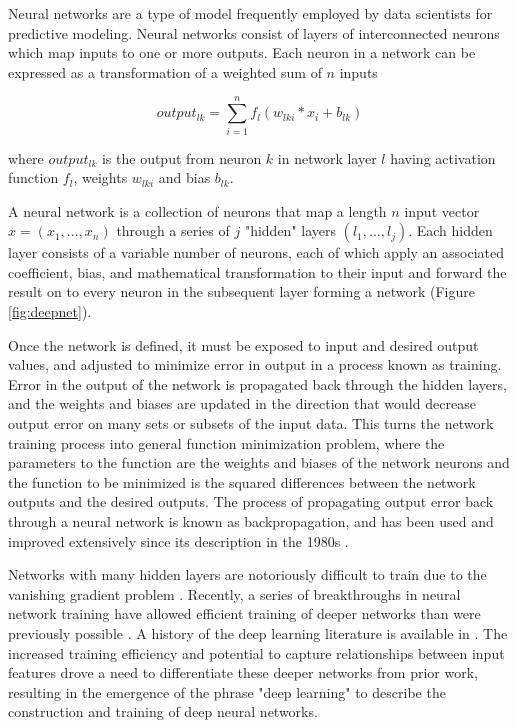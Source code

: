 Neural networks are a type of model frequently employed by data scientists
for predictive modeling. Neural networks consist of layers of interconnected neurons
which map inputs to one or more outputs. Each neuron in a network can be expressed as a 
transformation of a weighted sum of $n$ inputs 

\begin{equation}
output_{lk} = \sum_{i=1}^{n} f_l(w_{lki} * x_{i} + b_{lk})
\label{eq:neuron}
\end{equation}

where $output_{lk}$ is the output from neuron $k$ in network layer $l$ having activation
function $f_l$, weights $w_{lki}$ and bias $b_{lk}$.

A neural network is a collection of neurons that map a 
length $n$ input vector $x = (x_1, ..., x_n)$ through a series of $j$ 
"hidden" layers $(l_1, ..., l_j)$. Each hidden layer consists of a variable 
number of neurons, each of which apply an associated coefficient, bias, and 
mathematical transformation to their input and forward the 
result on to every neuron in the subsequent layer forming a network (Figure \ref{fig:deepnet}).

\ifdefined\showtablesandfigures
\fi

Once the network is defined, it must be exposed to input and desired output
values, and adjusted to minimize error in output in a process known as training.
Error in the output of the network is propagated back through the hidden 
layers, and the weights and biases are updated in the direction that would 
decrease output error on many sets or subsets of the input data. 
This turns the network training process into general 
function minimization problem, where the parameters to the function are the 
weights and biases of the network neurons and the function to be 
minimized is the squared differences between the network outputs and 
the desired outputs. The process of propagating output error back 
through a neural network is known as backpropagation, and has been used 
and improved extensively since its description in the 1980s \citep{rumelhart1986}. 


Networks with many hidden layers are notoriously difficult to train due to
the vanishing gradient problem \citep{hochreiter1998}. Recently, a series 
of breakthroughs in neural network training have allowed efficient 
training of deeper networks than were previously possible \citep{sutskever2013}.
A history of the deep learning literature is available in \cite{lecun2015}.
The increased training efficiency and potential to capture relationships 
between input features drove a need to differentiate these deeper networks
from prior work, resulting in the emergence of the phrase "deep learning" 
to describe the construction and training of deep neural networks.

